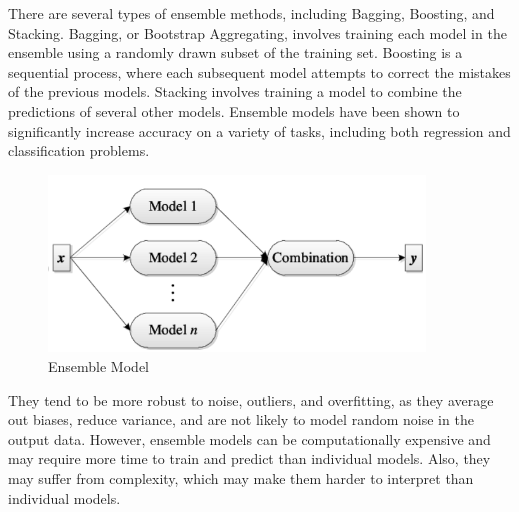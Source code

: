 \documentclass[12pt]{report}
\begin{document}
There are several types of ensemble methods, including Bagging, Boosting, and
Stacking. Bagging, or Bootstrap Aggregating, involves training each model in
the ensemble using a randomly drawn subset of the training set. Boosting is a
sequential process, where each subsequent model attempts to correct the
mistakes of the previous models. Stacking involves training a model to combine
the predictions of several other models\cite{wolpert1992stacked}. Ensemble
models have been shown to significantly increase accuracy on a variety of
tasks, including both regression and classification
problems\cite{opitz1999popular}.\newpage
\begin{figure}[ht]
      \centering
      \includegraphics[width=10cm]{./figures/vottingpic.png}
      \caption{Ensemble Model}\label{fig:fig4}
\end{figure}

They tend to be more robust to noise, outliers, and overfitting, as they
average out biases, reduce variance, and are not likely to model random noise
in the output data\cite{zhou2012ensemble}. However, ensemble models can be
computationally expensive and may require more time to train and predict than
individual models. Also, they may suffer from complexity, which may make them
harder to interpret than individual models\cite{rokach2010ensemble}.\newpage
\end{document}
